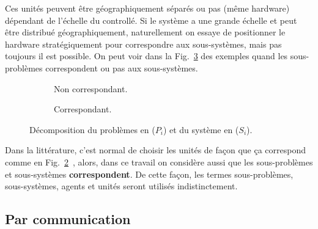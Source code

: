 \documentclass[../main.tex]{subfiles}
\begin{document}
Ces unités peuvent être géographiquement séparés ou pas (même hardware) dépendant de l'échelle du \cps{} controllé.
Si le système a une grande échelle et peut être distribué géographiquement, naturellement on essaye de positionner le hardware stratégiquement pour correspondre aux sous-systèmes, mais pas toujours il est possible.
On peut voir dans la Fig.~\ref{fig:corresponding_noncorresponding_fr} des exemples quand les sous-problèmes correspondent ou pas aux sous-systèmes.
\begin{figure}[h] \centering
  \begin{subfigure}{.4\textwidth}
    \centering
    \def\svgwidth{.8\textwidth}
    
    \caption{Non correspondant.}\label{fig:noncorresponding_division_system_problem}
  \end{subfigure} \hfill
  \begin{subfigure}{.4\textwidth} \centering
    \def\svgwidth{.8\textwidth}
    
    \caption{Correspondant.}\label{fig:corresponding_division_system_problem}
  \end{subfigure}
  \caption{Décomposition du problèmes en ($P_i$) et du système en ($S_{i}$).}\label{fig:corresponding_noncorresponding_fr}
\end{figure}

Dans la littérature, c'est normal de choisir les unités de façon que ça correspond comme en Fig.~\ref{fig:corresponding_division_system_problem}~\cite{ArauzEtAl2021}, alors, dans ce travail on considère aussi que les sous-problèmes et sous-systèmes \textbf{correspondent}.
De cette façon, les termes sous-problèmes, sous-systèmes, agents et unités seront utilisés indistinctement.

\subsection{Par communication}\label{sec:par-communication}
\end{document}
